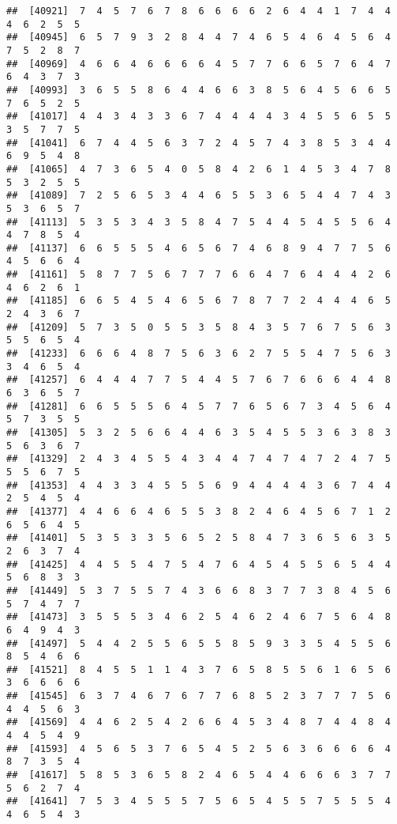 \documentclass[
]{book}
\begin{document}
\begin{verbatim}
##  [40921]  7  4  5  7  6  7  8  6  6  6  6  2  6  4  4  1  7  4  4  4  6  2  5  5
##  [40945]  6  5  7  9  3  2  8  4  4  7  4  6  5  4  6  4  5  6  4  7  5  2  8  7
##  [40969]  4  6  6  4  6  6  6  6  4  5  7  7  6  6  5  7  6  4  7  6  4  3  7  3
##  [40993]  3  6  5  5  8  6  4  4  6  6  3  8  5  6  4  5  6  6  5  7  6  5  2  5
##  [41017]  4  4  3  4  3  3  6  7  4  4  4  4  3  4  5  5  6  5  5  3  5  7  7  5
##  [41041]  6  7  4  4  5  6  3  7  2  4  5  7  4  3  8  5  3  4  4  6  9  5  4  8
##  [41065]  4  7  3  6  5  4  0  5  8  4  2  6  1  4  5  3  4  7  8  5  3  2  5  5
##  [41089]  7  2  5  6  5  3  4  4  6  5  5  3  6  5  4  4  7  4  3  5  3  6  5  7
##  [41113]  5  3  5  3  4  3  5  8  4  7  5  4  4  5  4  5  5  6  4  4  7  8  5  4
##  [41137]  6  6  5  5  5  4  6  5  6  7  4  6  8  9  4  7  7  5  6  4  5  6  6  4
##  [41161]  5  8  7  7  5  6  7  7  7  6  6  4  7  6  4  4  4  2  6  4  6  2  6  1
##  [41185]  6  6  5  4  5  4  6  5  6  7  8  7  7  2  4  4  4  6  5  2  4  3  6  7
##  [41209]  5  7  3  5  0  5  5  3  5  8  4  3  5  7  6  7  5  6  3  5  5  6  5  4
##  [41233]  6  6  6  4  8  7  5  6  3  6  2  7  5  5  4  7  5  6  3  3  4  6  5  4
##  [41257]  6  4  4  4  7  7  5  4  4  5  7  6  7  6  6  6  4  4  8  6  3  6  5  7
##  [41281]  6  6  5  5  5  6  4  5  7  7  6  5  6  7  3  4  5  6  4  5  7  3  5  5
##  [41305]  5  3  2  5  6  6  4  4  6  3  5  4  5  5  3  6  3  8  3  5  6  3  6  7
##  [41329]  2  4  3  4  5  5  4  3  4  4  7  4  7  4  7  2  4  7  5  5  5  6  7  5
##  [41353]  4  4  3  3  4  5  5  5  6  9  4  4  4  4  3  6  7  4  4  2  5  4  5  4
##  [41377]  4  4  6  6  4  6  5  5  3  8  2  4  6  4  5  6  7  1  2  6  5  6  4  5
##  [41401]  5  3  5  3  3  5  6  5  2  5  8  4  7  3  6  5  6  3  5  2  6  3  7  4
##  [41425]  4  4  5  5  4  7  5  4  7  6  4  5  4  5  5  6  5  4  4  5  6  8  3  3
##  [41449]  5  3  7  5  5  7  4  3  6  6  8  3  7  7  3  8  4  5  6  5  7  4  7  7
##  [41473]  3  5  5  5  3  4  6  2  5  4  6  2  4  6  7  5  6  4  8  6  4  9  4  3
##  [41497]  5  4  4  2  5  5  6  5  5  8  5  9  3  3  5  4  5  5  6  8  5  4  6  6
##  [41521]  8  4  5  5  1  1  4  3  7  6  5  8  5  5  6  1  6  5  6  3  6  6  6  6
##  [41545]  6  3  7  4  6  7  6  7  7  6  8  5  2  3  7  7  7  5  6  4  4  5  6  3
##  [41569]  4  4  6  2  5  4  2  6  6  4  5  3  4  8  7  4  4  8  4  4  4  5  4  9
##  [41593]  4  5  6  5  3  7  6  5  4  5  2  5  6  3  6  6  6  6  4  8  7  3  5  4
##  [41617]  5  8  5  3  6  5  8  2  4  6  5  4  4  6  6  6  3  7  7  5  6  2  7  4
##  [41641]  7  5  3  4  5  5  5  7  5  6  5  4  5  5  7  5  5  5  4  4  6  5  4  3

\end{verbatim}
\end{document}
